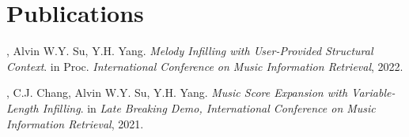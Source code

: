 
\section{Publications}
\begin{thebibliography}{1}
    , Alvin W.Y. Su, Y.H. Yang.
    \newblock \emph{Melody Infilling with User-Provided Structural Context}.
    \newblock in Proc. \emph{International Conference on Music Information Retrieval}, 2022.

    , C.J. Chang, Alvin W.Y. Su, Y.H. Yang.
    \newblock \emph{Music Score Expansion with Variable-Length Infilling}.
    \newblock in \emph{Late Breaking Demo, International Conference on Music Information Retrieval}, 2021.

\end{thebibliography}


% 
% 



